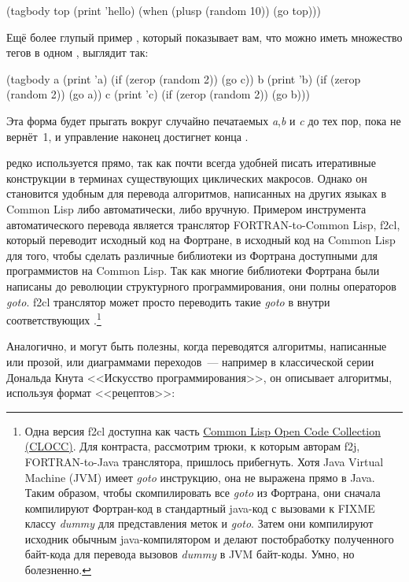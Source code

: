 \begin{myverb}
(tagbody
 top
   (print 'hello)
   (when (plusp (random 10)) (go top)))
\end{myverb}

Ещё более глупый пример , который показывает вам, что можно иметь множество
тегов в одном , выглядит так:

\begin{myverb}
(tagbody
 a (print 'a) (if (zerop (random 2)) (go c))
 b (print 'b) (if (zerop (random 2)) (go a))
 c (print 'c) (if (zerop (random 2)) (go b)))
\end{myverb}

Эта форма будет прыгать вокруг случайно печатаемых \textit{a},\textit{b} и \textit{c} до
тех пор, пока  не вернёт~1, и управление наконец достигнет конца
.

 редко используется прямо, так как почти всегда удобней писать итеративные
конструкции в терминах существующих циклических макросов. Однако он становится удобным для
перевода алгоритмов, написанных на других языках в Common Lisp либо автоматически, либо
вручную. Примером инструмента автоматического перевода является транслятор
FORTRAN-to-Common Lisp, f2cl, который переводит исходный код на Фортране, в исходный код
на Common Lisp для того, чтобы сделать различные библиотеки из Фортрана доступными для
программистов на Common Lisp. Так как многие библиотеки Фортрана были написаны до
революции структурного программирования, они полны операторов \textit{goto}. f2cl
транслятор может просто переводить такие \textit{goto} в  внутри соответствующих
.\footnote{Одна версия f2cl доступна как часть
  \href{http://clocc.sourceforge.net/}{Common Lisp Open Code Collection (CLOCC)}. Для
  контраста, рассмотрим трюки, к которым авторам f2j, FORTRAN-to-Java транслятора,
  пришлось прибегнуть. Хотя Java Virtual Machine (JVM) имеет \textit{goto} инструкцию, она
  не выражена прямо в Java. Таким образом, чтобы скомпилировать все \textit{goto} из
  Фортрана, они сначала компилируют Фортран-код в стандартный java-код с вызовами к FIXME
  классу \textit{dummy} для представления меток и \textit{goto}. Затем они компилируют
  исходник обычным java-компилятором и делают постобработку полученного байт-кода для
  перевода вызовов \textit{dummy} в JVM байт-коды. Умно, но болезненно.}

Аналогично,  и  могут быть полезны, когда переводятся алгоритмы,
написанные или прозой, или диаграммами переходов~--- например в классической серии
Дональда Кнута <<Искусство программирования>>, он описывает алгоритмы, используя формат
<<рецептов>>: 

